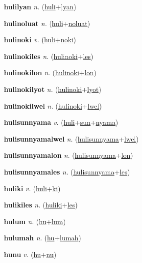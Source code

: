 \textbf{\hypertarget{hulilyan}{hulilyan}} \textit{n.} (\hyperlink{huli}{huli}+\allowbreak \hyperlink{lyan}{lyan})


\textbf{\hypertarget{hulinoluat}{hulinoluat}} \textit{n.} (\hyperlink{huli}{huli}+\allowbreak \hyperlink{noluat}{noluat})


\textbf{\hypertarget{hulinoki}{hulinoki}} \textit{v.} (\hyperlink{huli}{huli}+\allowbreak \hyperlink{noki}{noki})


\textbf{\hypertarget{hulinokiles}{hulinokiles}} \textit{n.} (\hyperlink{hulinoki}{hulinoki}+\allowbreak \hyperlink{les}{les})


\textbf{\hypertarget{hulinokilon}{hulinokilon}} \textit{n.} (\hyperlink{hulinoki}{hulinoki}+\allowbreak \hyperlink{lon}{lon})


\textbf{\hypertarget{hulinokilyot}{hulinokilyot}} \textit{n.} (\hyperlink{hulinoki}{hulinoki}+\allowbreak \hyperlink{lyot}{lyot})


\textbf{\hypertarget{hulinokilwel}{hulinokilwel}} \textit{n.} (\hyperlink{hulinoki}{hulinoki}+\allowbreak \hyperlink{lwel}{lwel})


\textbf{\hypertarget{hulisunnyama}{hulisunnyama}} \textit{v.} (\hyperlink{huli}{huli}+\allowbreak \hyperlink{sun}{sun}+\allowbreak \hyperlink{nyama}{nyama})


\textbf{\hypertarget{hulisunnyamalwel}{hulisunnyamalwel}} \textit{n.} (\hyperlink{hulisunnyama}{hulisunnyama}+\allowbreak \hyperlink{lwel}{lwel})


\textbf{\hypertarget{hulisunnyamalon}{hulisunnyamalon}} \textit{n.} (\hyperlink{hulisunnyama}{hulisunnyama}+\allowbreak \hyperlink{lon}{lon})


\textbf{\hypertarget{hulisunnyamales}{hulisunnyamales}} \textit{n.} (\hyperlink{hulisunnyama}{hulisunnyama}+\allowbreak \hyperlink{les}{les})


\textbf{\hypertarget{huliki}{huliki}} \textit{v.} (\hyperlink{huli}{huli}+\allowbreak \hyperlink{ki}{ki})


\textbf{\hypertarget{hulikiles}{hulikiles}} \textit{n.} (\hyperlink{huliki}{huliki}+\allowbreak \hyperlink{les}{les})


\textbf{\hypertarget{hulum}{hulum}} \textit{n.} (\hyperlink{hu}{hu}+\allowbreak \hyperlink{lum}{lum})


\textbf{\hypertarget{hulumah}{hulumah}} \textit{n.} (\hyperlink{hu}{hu}+\allowbreak \hyperlink{lumah}{lumah})


\textbf{\hypertarget{hunu}{hunu}} \textit{v.} (\hyperlink{hu}{hu}+\allowbreak \hyperlink{nu}{nu})


